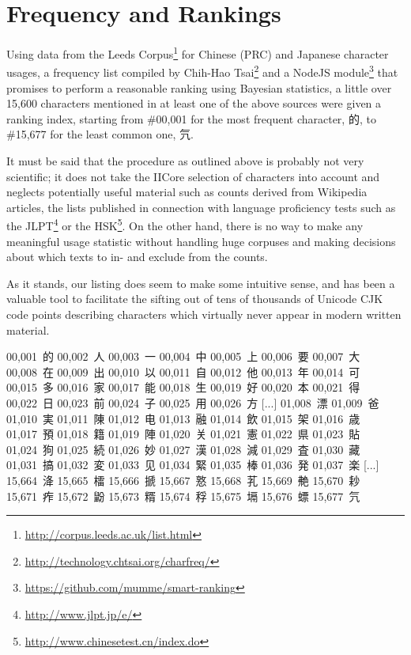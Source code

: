 \section{Frequency and Rankings
}
\begin{multicols}{2}Using data from the Leeds Corpus\footnote{\url{http://corpus.leeds.ac.uk/list.html}}
for Chinese (PRC) and Japanese character usages, a frequency list
compiled by Chih-Hao Tsai\footnote{\url{http://technology.chtsai.org/charfreq/}}
and a NodeJS module\footnote{\url{https://github.com/mumme/smart-ranking}}
that promises to perform a reasonable ranking using Bayesian statistics,
a little over 15,600
characters mentioned in at least one of the above sources were given a
ranking index, starting from \#00,001 for the most frequent character, {\cjk{}的}, to
\#15,677 for the least common one, {\cjk{}氕}.\mktsShowpar\par
It must be said that the procedure as outlined above is probably not
very scientific; it does not take the IICore selection of characters
into account and neglects potentially useful material such as counts derived
from Wikipedia articles, the lists published in connection with language
proficiency tests such as the JLPT\footnote{\url{http://www.jlpt.jp/e/}} or
the HSK\footnote{\url{http://www.chinesetest.cn/index.do}}. On the other hand,
there is no way to make any meaningful usage statistic without handling
huge corpuses and making decisions about which texts to in- and exclude from
the counts.\mktsShowpar\par
As it stands, our listing does seem to make some intuitive sense,
and has been a valuable tool to facilitate the sifting out of tens of
thousands of Unicode CJK code points describing characters which
virtually never appear in modern written material.\mktsShowpar\par
\begingroup\mktsObeyAllLines{}

\begingroup\mktsStyleCode{}00,001 {\cjk{}的}
00,002 {\cjk{}人}
00,003 {\cjk{}一}
00,004 {\cjk{}中}
00,005 {\cjk{}上}
00,006 {\cjk{}要}
00,007 {\cjk{}大}
00,008 {\cjk{}在}
00,009 {\cjk{}出}
00,010 {\cjk{}以}
00,011 {\cjk{}自}
00,012 {\cjk{}他}
00,013 {\cjk{}年}
00,014 {\cjk{}可}
00,015 {\cjk{}多}
00,016 {\cjk{}家}
00,017 {\cjk{}能}
00,018 {\cjk{}生}
00,019 {\cjk{}好}
00,020 {\cjk{}本}
00,021 {\cjk{}得}
00,022 {\cjk{}日}
00,023 {\cjk{}前}
00,024 {\cjk{}子}
00,025 {\cjk{}用}
00,026 {\cjk{}方}
[...]
01,008 {\cjk{}漂}
01,009 {\cjk{}爸}
01,010 {\cjk{}実}
01,011 {\cjk{}陳}
01,012 {\cjk{}电}
01,013 {\cjk{}融}
01,014 {\cjk{}飲}
01,015 {\cjk{}架}
01,016 {\cjk{}歳}
01,017 {\cjk{}預}
01,018 {\cjk{}籍}
01,019 {\cjk{}陣}
01,020 {\cjk{}关}
01,021 {\cjk{}憲}
01,022 {\cjk{}県}
01,023 {\cjk{}貼}
01,024 {\cjk{}狗}
01,025 {\cjk{}続}
01,026 {\cjk{}妙}
01,027 {\cjk{}漢}
01,028 {\cjk{}減}
01,029 {\cjk{}査}
01,030 {\cjk{}藏}
01,031 {\cjk{}搞}
01,032 {\cjk{}変}
01,033 {\cjk{}见}
01,034 {\cjk{}緊}
01,035 {\cjk{}棒}
01,036 {\cjk{}発}
01,037 {\cjk{}楽}
[...]
15,664 {\cjk{}洚}
15,665 {\cjk{}檑}
15,666 {\cjk{}搋}
15,667 {\cjk{}憝}
15,668 {\cjk{}芤}
15,669 {\cjk{}艴}
15,670 {\cjk{}耖}
15,671 {\cjk{}痄}
15,672 {\cjk{}鼢}
15,673 {\cjk{}糈}
15,674 {\cjk{}稃}
15,675 {\cjk{}塥}
15,676 {\cjk{}螵}
15,677 {\cjk{}氕}
\endgroup{}{}

\endgroup{}\end{multicols}
